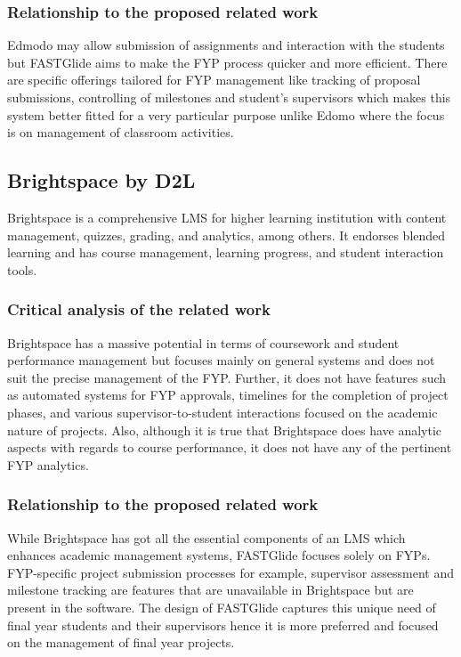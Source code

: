 \documentclass{FastFyp}
\begin{document}
\subsubsection{Relationship to the proposed related work}
Edmodo may allow submission of assignments and interaction with the students but FASTGlide aims to make the FYP process quicker and more efficient. There are specific offerings tailored for FYP management like tracking of proposal submissions, controlling of milestones and student’s supervisors which makes this system better fitted for a very particular purpose unlike Edomo where the focus is on management of classroom activities.
\subsection{Brightspace by D2L}
Brightspace \cite{ref:brightspace} is a comprehensive LMS for higher learning institution with content management, quizzes, grading, and analytics, among others. It endorses blended learning and has course management, learning progress, and student interaction tools.
\subsubsection{Critical analysis of the related work}
 Brightspace has a massive potential in terms of coursework and student performance management but focuses mainly on general systems and does not suit the precise management of the FYP. Further, it does not have features such as automated systems for FYP approvals, timelines for the completion of project phases, and various supervisor-to-student interactions focused on the academic nature of projects. Also, although it is true that Brightspace does have analytic aspects with regards to course performance, it does not have any of the pertinent FYP analytics.
\subsubsection{Relationship to the proposed related work}
While Brightspace has got all the essential components of an LMS which enhances academic management systems, FASTGlide focuses solely on FYPs. FYP-specific project submission processes for example, supervisor assessment and milestone tracking are features that are unavailable in Brightspace but are present in the software. The design of FASTGlide captures this unique need of final year students and their supervisors hence it is more preferred and focused on the management of final year projects.
\pagebreak
\end{document}
